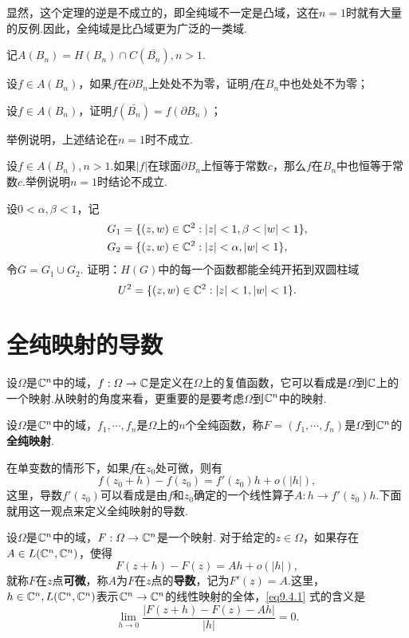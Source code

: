 显然，这个定理的逆是不成立的，即全纯域不一定是凸域，这在$n=1$时就有大量的反例.因此，全纯域是比凸域更为广泛的一类域.
\begin{xiti}
  \item 记$A(B_n)=H(B_n)\cap C(\bar{B_n}),n>1$.
    \begin{enuma}
      \item 设$f\in A(B_n)$，如果$f$在$\partial B_n$上处处不为零，证明$f$在$B_n$中也处处不为零；
      \item 设$f\in A(B_n)$，证明$f(\bar{B_n})=f(\partial B_n)$；
      \item 举例说明，上述结论在$n=1$时不成立.
    \end{enuma}
  \item 设$f\in A(B_n),n>1$.如果$|f|$在球面$\partial B_n$上恒等于常数$c$，那么$f$在$B_n$中也恒等于常数$c$.举例说明$n=1$时结论不成立.
  \item 设$0<\alpha,\beta<1$，记
    \begin{align*}
      & G_1 = \{(z,w)\in\MC^2:|z|<1,\beta<|w|<1\},\\
      & G_2 = \{(z,w)\in\MC^2:|z|<\alpha,|w|<1\},
    \end{align*}
    令$G=G_1\cup G_2$. 证明：$H(G)$中的每一个函数都能全纯开拓到双圆柱域
    \[
      U^2 = \{(z,w)\in\mathbb C^2:|z|<1,|w|<1\}.
    \]
\end{xiti}

\section{全纯映射的导数\label{sec9.4}}
设$\Omega$是$\mathbb C^n$中的域，$f:\varOmega\to \mathbb C$是定义在$\Omega$上的复值函数，它可以看成是$\Omega$到$\mathbb C$上的一个映射.从映射的角度来看，更重要的是要考虑$\Omega$到$\mathbb C^n$中的映射.
\begin{theorem}\label{def9.4.1}
  设$\Omega$是$\mathbb C^n$中的域，$f_1,\cdots,f_n$是$\Omega$上的$n$个全纯函数，称$F=(f_1,\cdots,f_n)$是$\Omega$到$\mathbb C^n$的\textbf{全纯映射}.
\end{theorem}

在单变数的情形下，如果$f$在$z_0$处可微，则有
\[
  f(z_0+h) - f(z_0) = f'(z_0)h + o(|h|),
\]
这里，导数$f'(z_0)$可以看成是由$f$和$z_0$确定的一个线性算子$A:h\to f'(z_0)h$.下面就用这一观点来定义全纯映射的导数.

\begin{definition}\label{def9.4.2}
  设$\Omega$是$\mathbb C^n$中的域，$F:\varOmega\to\mathbb C^n$是一个映射. 对于给定的$z\in\Omega$，如果存在$A\in L(\mathbb C^n,\mathbb C^n)$，使得
  \begin{equation}\label{eq9.4.1}
    F(z + h) - F(z) = Ah + o(|h|),
  \end{equation}
  就称$F$在$z$点\textbf{可微}，称$A$为$F$在$z$点的\textbf{导数}，记为$F'(z)=A$.这里，$h\in \mathbb C^n,L(\mathbb C^n,\mathbb C^n)$表示$\mathbb C^n\to\mathbb C^n$的线性映射的全体，\eqref{eq9.4.1} 式的含义是
  \[
    \lim_{h\to0}\frac{|F(z + h) - F(z) - Ah|}{|h|} = 0.
  \]
\end{definition}

